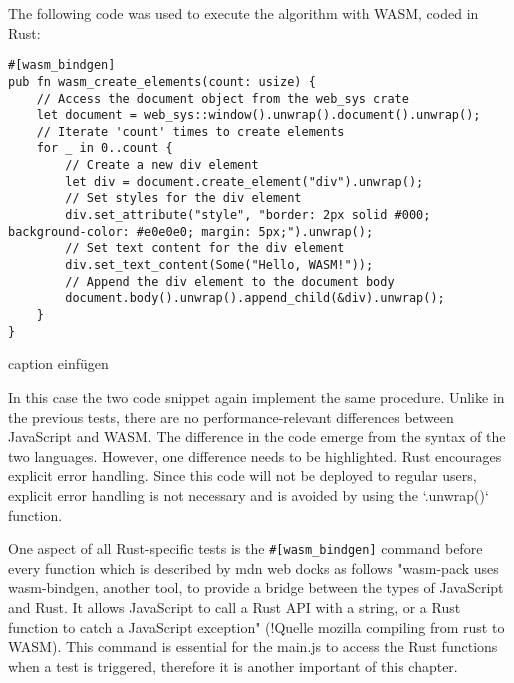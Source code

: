 The following code was used to execute the algorithm with WASM, coded in Rust:
\begin{verbatim}
#[wasm_bindgen]
pub fn wasm_create_elements(count: usize) {
    // Access the document object from the web_sys crate
    let document = web_sys::window().unwrap().document().unwrap();
    // Iterate 'count' times to create elements
    for _ in 0..count {
        // Create a new div element
        let div = document.create_element("div").unwrap();
        // Set styles for the div element
        div.set_attribute("style", "border: 2px solid #000; background-color: #e0e0e0; margin: 5px;").unwrap();
        // Set text content for the div element
        div.set_text_content(Some("Hello, WASM!"));
        // Append the div element to the document body
        document.body().unwrap().append_child(&div).unwrap();
    }
}
\end{verbatim}
caption einfügen

In this case the two code snippet again implement the same procedure. Unlike in the previous tests, there are no performance-relevant differences between JavaScript and WASM. The difference in the code emerge from the syntax of the two languages. However, one difference needs to be highlighted. Rust encourages explicit error handling. Since this code will not be deployed to regular users, explicit error handling is not necessary and is avoided by using the `.unwrap()` function.

One aspect of all Rust-specific tests is the \texttt{\#[wasm\_bindgen]} command before every function which is described by mdn web docks as follows "wasm-pack uses wasm-bindgen, another tool, to provide a bridge between the types of JavaScript and Rust. It allows JavaScript to call a Rust API with a string, or a Rust function to catch a JavaScript exception" (!Quelle mozilla compiling from rust to WASM). This command is essential for the main.js to access the Rust functions when a test is triggered, therefore it is another important of this chapter. 
